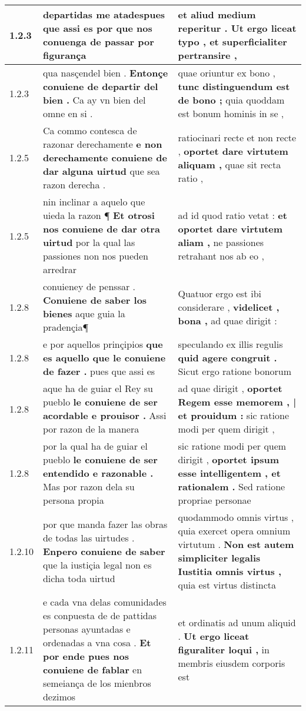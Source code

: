 \begin{tabular}{|p{1cm}|p{6.5cm}|p{6.5cm}|}
1.2.3 & departidas me \textbf{ atadespues que assi es por que nos conuenga de passar } por figurança & et aliud medium reperitur . \textbf{ Ut ergo liceat typo , } et superficialiter pertransire , \\\hline
1.2.3 & qua nasçendel bien . \textbf{ Entonçe conuiene de departir del bien . } Ca ay vn bien del omne en si . & quae oriuntur ex bono , \textbf{ tunc distinguendum est de bono ; } quia quoddam est bonum hominis in se , \\\hline
1.2.5 & Ca commo contesca de razonar derechamente \textbf{ e non derechamente conuiene de dar alguna uirtud } que sea razon derecha . & ratiocinari recte et non recte , \textbf{ oportet dare virtutem aliquam , } quae sit recta ratio , \\\hline
1.2.5 & nin inclinar a aquelo que uieda la razon ¶ \textbf{ Et otrosi nos conuiene de dar otra uirtud } por la qual las passiones non nos pueden arredrar & ad id quod ratio vetat : \textbf{ et oportet dare virtutem aliam , } ne passiones retrahant nos ab eo , \\\hline
1.2.8 & conuieney de penssar . \textbf{ Conuiene de saber los bienes } aque guia la pradençia¶ & Quatuor ergo est ibi considerare , \textbf{ videlicet , bona , } ad quae dirigit : \\\hline
1.2.8 & e por aquellos prinçipios \textbf{ que es aquello que le conuiene de fazer . } pues que assi es & speculando ex illis regulis \textbf{ quid agere congruit . } Sicut ergo ratione bonorum \\\hline
1.2.8 & aque ha de guiar el Rey su pueblo \textbf{ le conuiene de ser acordable e prouisor . } Assi por razon de la manera & ad quae dirigit , \textbf{ oportet Regem esse memorem , | et prouidum : } sic ratione modi per quem dirigit , \\\hline
1.2.8 & por la qual ha de guiar el pueblo \textbf{ le conuiene de ser entendido e razonable . } Mas por razon dela su persona propia & sic ratione modi per quem dirigit , \textbf{ oportet ipsum esse intelligentem , et rationalem . } Sed ratione propriae personae \\\hline
1.2.10 & por que manda fazer las obras de todas las uirtudes . \textbf{ Enpero conuiene de saber } que la iustiçia legal non es dicha toda uirtud & quodammodo omnis virtus , quia exercet opera omnium virtutum . \textbf{ Non est autem simpliciter legalis Iustitia omnis virtus , } quia est virtus distincta \\\hline
1.2.11 & e cada vna delas comunidades es conpuesta de de pattidas personas ayuntadas e ordenadas a vna cosa . \textbf{ Et por ende pues nos conuiene de fablar } en semeiança de los mienbros dezimos & et ordinatis ad unum aliquid . \textbf{ Ut ergo liceat figuraliter loqui , } in membris eiusdem corporis est \\\hline

\end{tabular}
